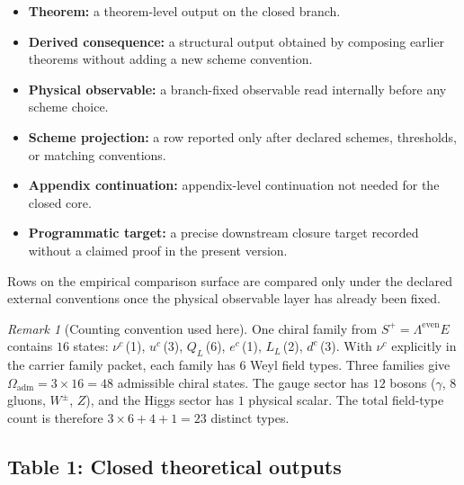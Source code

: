 \documentclass[11pt,a4paper]{article}
\theoremstyle{definition}
\theoremstyle{remark}
\newtheorem*{remark}{Remark}
\newcommand{\Oadm}{\Omega_{\mathrm{adm}}}
\begin{document}
\begin{tcolorbox}[colback=tfptblue!2, colframe=tfptblue!50, breakable,
    title={Status legend for the particle ledger}, colbacktitle=tfptblue!70]
\begin{itemize}[leftmargin=1.5em, topsep=3pt, itemsep=2pt]
\item \textbf{Theorem:} a theorem-level output on the closed branch.
\item \textbf{Derived consequence:} a structural output obtained by composing earlier theorems without adding a new scheme convention.
\item \textbf{Physical observable:} a branch-fixed observable read internally before any scheme choice.
\item \textbf{Scheme projection:} a row reported only after declared schemes, thresholds, or matching conventions.
\item \textbf{Appendix continuation:} appendix-level continuation not needed for the closed core.
\item \textbf{Programmatic target:} a precise downstream closure target recorded without a claimed proof in the present version.
\end{itemize}
Rows on the empirical comparison surface are compared only under the declared external
conventions once the physical observable layer has already been fixed.
\end{tcolorbox}

\begin{remark}[Counting convention used here]
\label{rem:counting-convention}
One chiral family from $S^+=\Lambda^{\mathrm{even}}E$ contains $16$ states:
$\nu^c$\,(1), $u^c$\,(3), $Q_L$\,(6), $e^c$\,(1), $L_L$\,(2), $d^c$\,(3).
With $\nu^c$ explicitly in the carrier family packet, each family has $6$ Weyl field types.
Three families give $\Oadm=3\times 16=48$ admissible chiral states.
The gauge sector has $12$ bosons ($\gamma$, $8$ gluons, $W^\pm$, $Z$), and the Higgs sector has
$1$ physical scalar. The total field-type count is therefore $3\times 6+4+1=23$ distinct types.
\end{remark}

\subsection{Table 1: Closed theoretical outputs}
\end{document}
